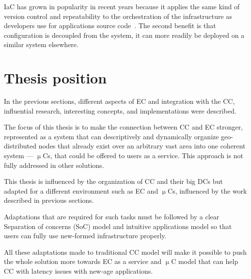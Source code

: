 IaC has grown in popularity in recent years because it applies the same kind of version control and repeatability to the orchestration of the infrastructure as developers use for applications source code~\cite{ArtacBNGT17}. The second benefit is that configuration is decoupled from the system, it can more readily be deployed on a similar system elsewhere.
%
%
\section{Thesis position}\label{sec:thesis_position}
%
In the previous sections, different aspects of EC and integration with the CC, influential research, interesting concepts, and implementations were described.

The focus of this thesis is to make the connection between CC and EC stronger, represented as a system that can descriptively and dynamically organize geo-distributed nodes that already exist over an arbitrary vast area into one coherent system --- $\upmu$Cs, that could be offered to users as a service. This approach is not fully addressed in other solutions. 

This thesis is influenced by the organization of CC and their big DCs but adapted for a different environment such as EC and $\upmu$Cs, influenced by the work described in previous sections. 

Adaptations that are required for such tasks must be followed by a clear Separation of concerns (SoC) model and intuitive applications model so that users can fully use new-formed infrastructure properly. 

All these adaptations made to traditional CC model will make it possible to push the whole solution more towards EC as a service and $\upmu$C model that can help CC with latency issues with new-age applications.
%
%